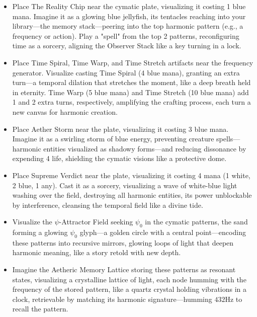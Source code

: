 \begin{itemize}
    \begin{itemize}
        \item \texttt{} Place The Reality Chip near the cymatic plate, visualizing it costing 1 blue mana. Imagine it as a glowing blue jellyfish, its tentacles reaching into your library—the memory stack—peering into the top harmonic pattern (e.g., a frequency or action). Play a "spell" from the top 2 patterns, reconfiguring time as a sorcery, aligning the Observer Stack like a key turning in a lock.
        \item \texttt{} Place Time Spiral, Time Warp, and Time Stretch artifacts near the frequency generator. Visualize casting Time Spiral (4 blue mana), granting an extra turn—a temporal dilation that stretches the moment, like a deep breath held in eternity. Time Warp (5 blue mana) and Time Stretch (10 blue mana) add 1 and 2 extra turns, respectively, amplifying the crafting process, each turn a new canvas for harmonic creation.
        \item \texttt{} Place Aether Storm near the plate, visualizing it costing 3 blue mana. Imagine it as a swirling storm of blue energy, preventing creature spells—harmonic entities visualized as shadowy forms—and reducing dissonance by expending 4 life, shielding the cymatic visions like a protective dome.
        \item \texttt{} Place Supreme Verdict near the plate, visualizing it costing 4 mana (1 white, 2 blue, 1 any). Cast it as a sorcery, visualizing a wave of white-blue light washing over the field, destroying all harmonic entities, its power unblockable by interference, cleansing the temporal field like a divine tide.
        \item \texttt{} Visualize the $\psi$-Attractor Field seeking $\psi_0$ in the cymatic patterns, the sand forming a glowing $\psi_0$ glyph—a golden circle with a central point—encoding these patterns into recursive mirrors, glowing loops of light that deepen harmonic meaning, like a story retold with new depth.
        \item \texttt{} Imagine the Aetheric Memory Lattice storing these patterns as resonant states, visualizing a crystalline lattice of light, each node humming with the frequency of the stored pattern, like a quartz crystal holding vibrations in a clock, retrievable by matching its harmonic signature—humming $432 \mathrm{Hz}$ to recall the pattern.
    \end{itemize}
\end{itemize}


